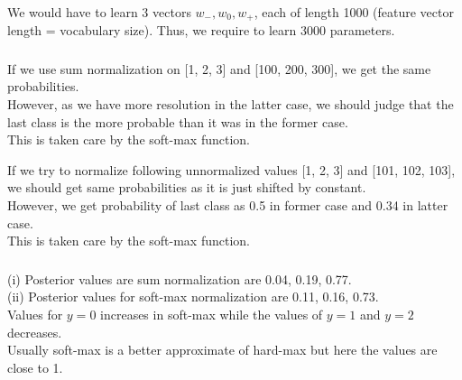 \documentclass[12pt, fleqn]{article}
\begin{document}
\subsubsection{}
We would have to learn 3 vectors $w_-, w_0, w_+$, each of length 1000 (feature vector length = vocabulary size). Thus, we require to learn 3000 parameters.

\subsubsection{}
If we use sum normalization on [1, 2, 3] and [100, 200, 300], we get the same probabilities. \\
However, as we have more resolution in the latter case, we should judge that the last class is the more probable than it was in the former case. \\
This is taken care by the soft-max function.

If we try to normalize following unnormalized values [1, 2, 3] and [101, 102, 103], we should get same probabilities as it is just shifted by constant. \\
However, we get probability of last class as 0.5 in former case and 0.34 in latter case. \\
This is taken care by the soft-max function.

\subsubsection{}
(i) Posterior values are sum normalization are 0.04, 0.19, 0.77. \\
(ii) Posterior values for soft-max normalization are 0.11, 0.16, 0.73. \\
Values for $y=0$ increases in soft-max while the values of $y=1$ and $y=2$ decreases. \\
Usually soft-max is a better approximate of hard-max but here the values are close to 1.
\end{document}
